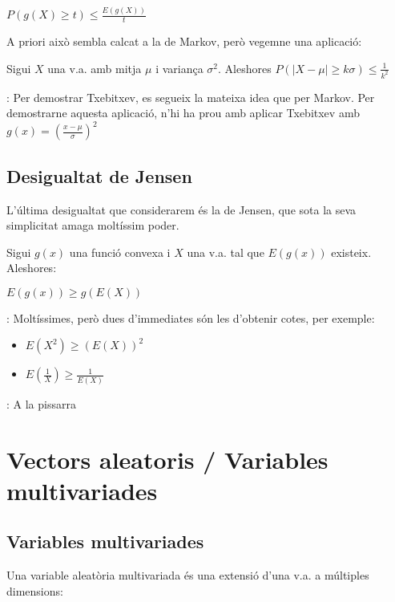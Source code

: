 \documentclass[letterpaper,10pt,english]{sphinxmanual}
\begin{document}
\(P(g(X) \geq t) \leq \frac{E(g(X))}{t}\)

A priori això sembla calcat a la de Markov, però vegem\sphinxhyphen{}ne una aplicació:

Sigui \(X\) una v.a. amb mitja \(\mu\) i variança \(\sigma^2\). Aleshores
\(P(|X - \mu| \geq k \sigma) \leq \frac{1}{k^2}\)

: Per demostrar Txebitxev, es segueix la mateixa idea que per Markov.
Per demostrar\sphinxhyphen{}ne aquesta aplicació, n’hi ha prou amb aplicar Txebitxev amb \(g(x) = \left(\frac{x - \mu}{\sigma}\right)^2\)


\subsection{Desigualtat de Jensen}
\label{\detokenize{0_Intro/0_1_Repas_probabilitat:desigualtat-de-jensen}}
L’última desigualtat que considerarem és la de Jensen, que sota
la seva simplicitat amaga moltíssim poder.

Sigui \(g(x)\) una funció convexa i \(X\) una v.a. tal que \(E(g(x))\)
existeix. Aleshores:

\(E(g(x)) \geq g(E(X))\)

: Moltíssimes, però dues d’immediates són les d’obtenir cotes, per exemple:
\begin{itemize}
\item {} 
\(E(X^2) \geq (E(X))^2\)

\item {} 
\(E(\frac{1}{X}) \geq \frac{1}{E(X)}\)

\end{itemize}

: A la pissarra


\section{Vectors aleatoris / Variables multivariades}
\label{\detokenize{0_Intro/0_1_Repas_probabilitat:vectors-aleatoris-variables-multivariades}}

\subsection{Variables multivariades}
\label{\detokenize{0_Intro/0_1_Repas_probabilitat:variables-multivariades}}
Una variable aleatòria multivariada és una extensió d’una v.a.
a múltiples dimensions:
\end{document}
